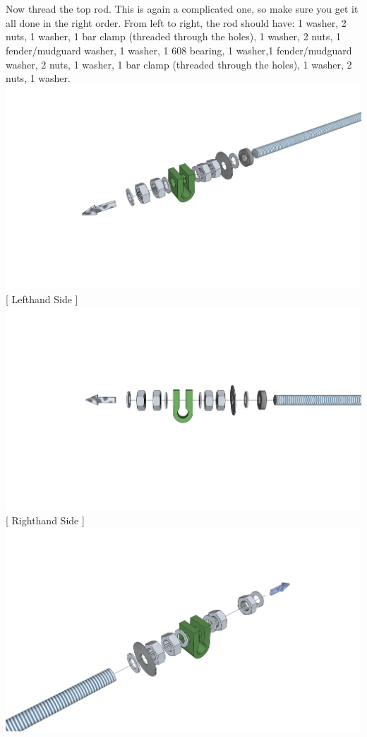 \documentclass[twoside,a4paper,titlepage]{memoir}
\begin{document}
	\section{}
	Now thread the top rod. This is again a complicated one, so make sure you get it all done in the right
	order. From left to right, the rod should have: 1 washer, 2 nuts, 1 washer, 1 bar clamp (threaded
	through the holes), 1 washer, 2 nuts, 1 fender/mudguard washer, 1 washer, 1 608 bearing, 1 washer,1
	fender/mudguard washer, 2 nuts, 1 washer, 1 bar clamp (threaded through the holes), 1 washer, 2 nuts,
	1 washer.\\
	\includegraphics[width=1\linewidth]{graphics/ch3_2_1.png}
	[ Lefthand Side ]
	\includegraphics[width=1\linewidth]{graphics/ch3_2_2.png}
	[ Righthand Side ]
	\includegraphics[width=1\linewidth]{graphics/ch3_2_3.png}
	
\end{document}
